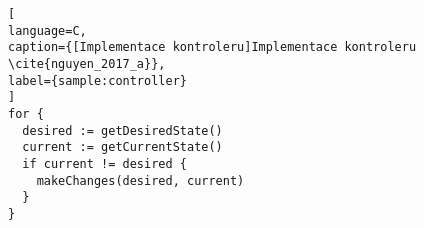 \begin{lstfloat}
\begin{lstlisting}[
language=C,
caption={[Implementace kontroleru]Implementace kontroleru \cite{nguyen_2017_a}},
label={sample:controller}
]
for {
  desired := getDesiredState()
  current := getCurrentState()
  if current != desired {
    makeChanges(desired, current)
  }
}
\end{lstlisting}
\end{lstfloat}